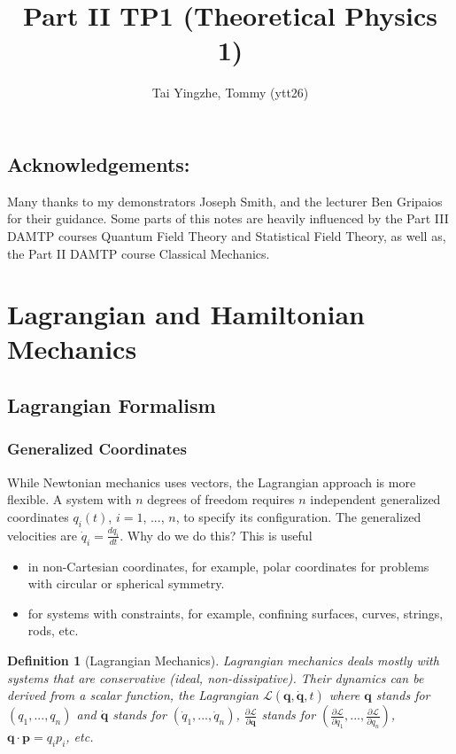 \documentclass[a4paper]{article}
\title{\textbf{Part II TP1 (Theoretical Physics 1)}}
\author{Tai Yingzhe, Tommy (ytt26)}
\date{}
\theoremstyle{new}
\newtheorem{defi}{Definition}[section]
\begin{document}
\maketitle
{\small\tableofcontents}
\subsection*{Acknowledgements:}
Many thanks to my demonstrators Joseph Smith, and the lecturer Ben Gripaios for their guidance. Some parts of this notes are heavily influenced by the Part III DAMTP courses Quantum Field Theory and Statistical Field Theory, as well as, the Part II DAMTP course Classical Mechanics.
\newpage
\section{Lagrangian and Hamiltonian Mechanics}
\subsection{Lagrangian Formalism}
\subsubsection{Generalized Coordinates}
While Newtonian mechanics uses vectors, the Lagrangian approach is more flexible. A system with $n$ degrees of freedom requires $n$ independent generalized coordinates $q_i(t)$, $i=1$, ..., $n$, to specify its configuration. The generalized velocities are $\dot{q}_i=\frac{dq_i}{dt}$. Why do we do this? This is useful
\begin{itemize}
    \item in non-Cartesian coordinates, for example, polar coordinates for problems with circular or spherical symmetry. 
    \item for systems with constraints, for example, confining surfaces, curves, strings, rods, etc.
\end{itemize}
\begin{defi}[Lagrangian Mechanics]
Lagrangian mechanics deals mostly with systems that are conservative (ideal, non-dissipative). Their dynamics can be derived from a scalar function, the Lagrangian $\mathcal{L}(\mathbf{q},\mathbf{\dot{q}},t)$ where $\mathbf{q}$ stands for $(q_1,...,q_n)$ and $\mathbf{\dot{q}}$ stands for $(\dot{q}_1,...,\dot{q}_n)$, $\frac{\partial\mathcal{L}}{\partial\mathbf{q}}$ stands for $(\frac{\partial\mathcal{L}}{\partial q_1},...,\frac{\partial\mathcal{L}}{\partial q_n})$, $\mathbf{q}\cdot\mathbf{p}=q_ip_i$, etc.
\end{defi}
\end{document}
